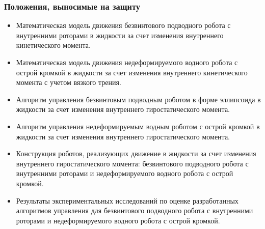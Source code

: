 \begin{frame}
    \frametitle{Положения, выносимые на защиту}
\small    
    \begin{itemize}
        \item Математическая модель движения безвинтового подводного робота с внутренними роторами в жидкости за счет изменения внутреннего кинетического момента.
        \item Математическая модель движения недеформируемого водного робота с острой кромкой в жидкости за счет изменения внутреннего кинетического момента с учетом вязкого трения.
        \item Алгоритм управления безвинтовым подводным роботом в форме эллипсоида в жидкости за счет изменения внутреннего гиростатического момента.
        \item Алгоритм управления недеформируемым водным роботом с острой кромкой в жидкости за счет изменения внутреннего гиростатического момента.
        \item Конструкция роботов, реализующих движение в жидкости за счет изменения внутреннего гиростатического момента:  безвинтового подводного робота с внутренними роторами и недеформируемого водного робота с острой кромкой.
        \item Результаты экспериментальных исследований по оценке разработанных алгоритмов управления для безвинтового подводного робота с внутренними роторами и недеформируемого водного робота с острой кромкой.
    \end{itemize}
\end{frame}
%
%
%
%
%
